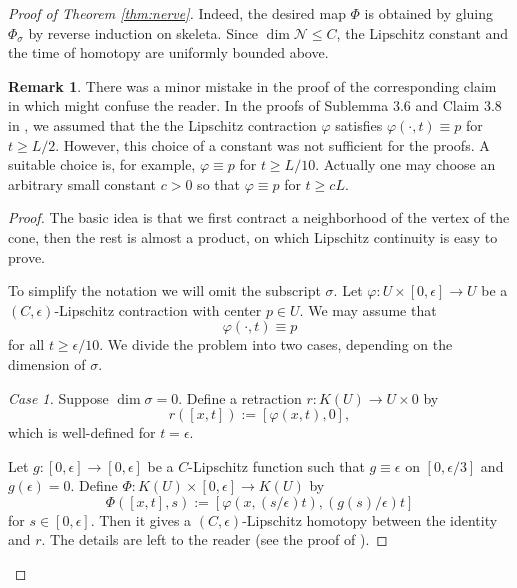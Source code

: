 \documentclass[a4paper,12pt]{amsart}
\theoremstyle{plain}
\theoremstyle{definition}
\newtheorem{rem}[thm]{Remark}
\numberwithin{thm}{section}
\numberwithin{equation}{section}
\newcommand{\step}[1]{\medskip\noindent\textit{#1.}}
\begin{document}
\begin{proof}[Proof of Theorem \ref{thm:nerve}]
Indeed, the desired map $\Phi$ is obtained by gluing $\Phi_\sigma$ by reverse induction on skeleta.
Since $\dim\mathcal N\le C$, the Lipschitz constant and the time of homotopy are uniformly bounded above.

\begin{rem}
There was a minor mistake in the proof of the corresponding claim in \cite{MY:lip} which might confuse the reader.
In the proofs of Sublemma 3.6 and Claim 3.8 in \cite{MY:lip}, we assumed that the the Lipschitz contraction $\varphi$ satisfies $\varphi(\cdot,t)\equiv p$ for $t\ge L/2$.
However, this choice of a constant was not sufficient for the proofs.
A suitable choice is, for example, $\varphi\equiv p$ for $t\ge L/10$.
Actually one may choose an arbitrary small constant $c>0$ so that $\varphi\equiv p$ for $t\ge cL$.
\end{rem}

\begin{proof}
The basic idea is that we first contract a neighborhood of the vertex of the cone, then the rest is almost a product, on which Lipschitz continuity is easy to prove.

To simplify the notation we will omit the subscript $\sigma$.
Let $\varphi:U\times[0,\epsilon] \to U$ be a $(C,\epsilon)$-Lipschitz contraction with center $p\in U$.
We may assume that
\begin{equation}\label{eq:varphi}
\varphi(\cdot,t)\equiv p
\end{equation}
for all $t\ge\epsilon/10$.
We divide the problem into two cases, depending on the dimension of $\sigma$.

\step{Case 1}
Suppose $\dim\sigma=0$.
Define a retraction $r:K(U)\to U\times 0$ by
\[r([x,t]):=[\varphi(x,t),0],\]
which is well-defined for $t=\epsilon$.

Let $g:[0,\epsilon]\to[0,\epsilon]$ be a $C$-Lipschitz function such that $g\equiv\epsilon$ on $[0,\epsilon/3]$ and $g(\epsilon)=0$.
Define $\Phi:K(U)\times[0,\epsilon]\to K(U)$ by
\[\Phi([x,t],s):=[\varphi(x,(s/\epsilon)t),(g(s)/\epsilon)t]\]
for $s\in[0,\epsilon]$.
Then it gives a $(C,\epsilon)$-Lipschitz homotopy between the identity and $r$.
The details are left to the reader (see the proof of \cite[3.8]{MY:lip}).


\end{proof}
\end{proof}
\end{document}
